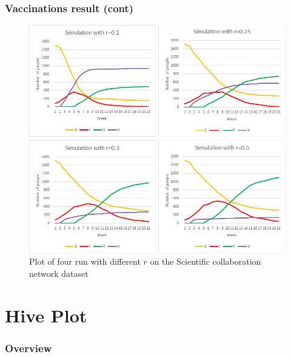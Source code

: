 \documentclass{beamer}
\begin{document}
\begin{frame}
\frametitle{Vaccinations result (cont)}
\begin{figure}[H]\label{fig:perc_diff}
\centering	
\includegraphics[scale=0.35]{img/graphtotal_science.png}
\caption{Plot of four run with different $r$ on the Scientific collaboration network dataset}
\end{figure}

\end{frame}

\section{Hive Plot}
\begin{frame}
\frametitle{Overview} %
\tableofcontents[currentsection] %
\end{frame}
\end{document}
